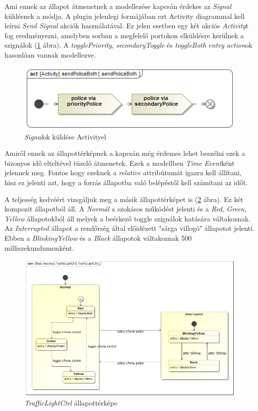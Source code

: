 Ami ennek az állapot átmenetnek a modellezése kapcsán érdekes az \emph{Signal} küldésnek a módja. A plugin jelenlegi formájában ezt Activity diagrammal kell leírni \emph{Send Signal} akciók használatával. Ez jelen esetben egy két akciós \emph{Activity}t fog eredményezni, amelyben sorban a megfelelő portokon elküldésre kerülnek a szignálok (\ref{fig:activity} ábra).  A \emph{togglePriority}, \emph{secondaryToggle} és \emph{toggleBoth} \emph{entry action}ok hasonlóan vannak modellezve.

\begin{figure}[!ht]
	\centering
	\includegraphics[width=12cm, keepaspectratio]{figures/contribution/sendPoliceBoth.png}
	\caption{\emph{Signal}ok küldése Activityel}
	\label{fig:activity}
\end{figure}

Amiről ennek az állapottérképnek a kapcsán még érdemes lehet beszélni ezek a bizonyos idő elteltével tüzelő átmenetek. Ezek a modellben \emph{Time Event}ként jelennek meg. Fontos hogy ezeknek a \emph{relative} attribútumát igazra kell állítani, hisz ez jelenti azt, hogy a forrás állapotba való belépéstől kell számítani az időt.

A teljesség kedvéért vizsgáljuk meg a másik állapottérképet is (\ref{fig:LightCtrlSM} ábra). Ez két kompozit állapotból áll. A \emph{Normál} a szokásos működést jelenti és a \emph{Red}, \emph{Green}, \emph{Yellow} állapotokból áll melyek a beérkező toggle szignálok hatására váltakoznak.
Az \emph{Interrupted} állapot a rendőrség által előidézett "sárga villogó" állapotot jelenti. Ebben a \emph{BlinkingYellow} és a \emph{Black} állapotok váltakoznak 500 milliszekundumonként.  

\begin{figure}[!ht]
	\centering
	\includegraphics[width=12cm, keepaspectratio]{figures/contribution/TrafficLightCtrlSM.png}
	\caption{\emph{TrafficLightCtrl} állapottérképe}
	\label{fig:LightCtrlSM}
\end{figure}


